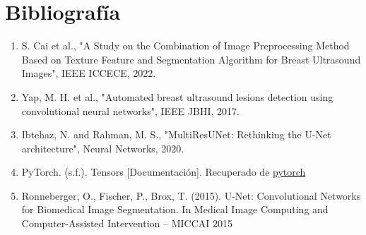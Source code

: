 \documentclass[12pt]{article}
\begin{document}
\section*{Bibliografía}
\begin{enumerate}
    \item S. Cai et al., "A Study on the Combination of Image Preprocessing Method Based on Texture Feature and Segmentation Algorithm for Breast Ultrasound Images", IEEE ICCECE, 2022.
    \item Yap, M. H. et al., "Automated breast ultrasound lesions detection using convolutional neural networks", IEEE JBHI, 2017.
    \item Ibtehaz, N. and Rahman, M. S., "MultiResUNet: Rethinking the U-Net architecture", Neural Networks, 2020.
    \item PyTorch. (s.f.). Tensors [Documentación]. Recuperado de \href{https://pytorch.org/docs/stable/tensors.html}{pytorch}
    \item Ronneberger, O., Fischer, P.,  Brox, T. (2015). U-Net: Convolutional Networks for Biomedical Image Segmentation. In Medical Image Computing and Computer-Assisted Intervention – MICCAI 2015
\end{enumerate}
\end{document}
